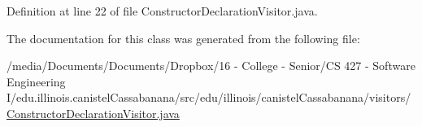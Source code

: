 Definition at line 22 of file ConstructorDeclarationVisitor.java.



The documentation for this class was generated from the following file:\begin{DoxyCompactItemize}
\item 
/media/Documents/Documents/Dropbox/16 -\/ College -\/ Senior/CS 427 -\/ Software Engineering I/edu.illinois.canistelCassabanana/src/edu/illinois/canistelCassabanana/visitors/\hyperlink{ConstructorDeclarationVisitor_8java}{ConstructorDeclarationVisitor.java}\end{DoxyCompactItemize}

